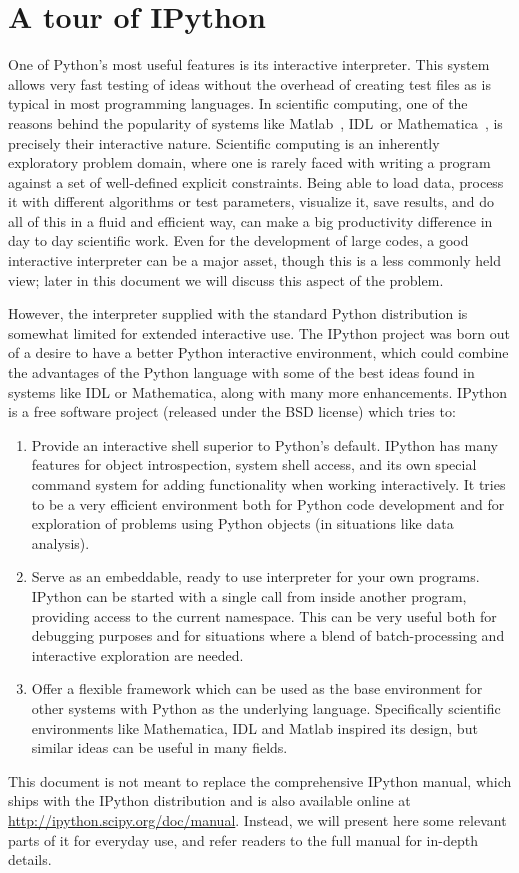 
\chapter{A tour of IPython}

One of Python's most useful features is its interactive interpreter.
This system allows very fast testing of ideas without the overhead
of creating test files as is typical in most programming languages.
In scientific computing, one of the reasons behind the popularity
of systems like Matlab~\texttrademark, IDL~\texttrademark or Mathematica~\texttrademark,
is precisely their interactive nature. Scientific computing is an
inherently exploratory problem domain, where one is rarely faced with
writing a program against a set of well-defined explicit constraints.
Being able to load data, process it with different algorithms or test
parameters, visualize it, save results, and do all of this in a fluid
and efficient way, can make a big productivity difference in day to
day scientific work. Even for the development of large codes, a good
interactive interpreter can be a major asset, though this is a less
commonly held view; later in this document we will discuss this aspect
of the problem.

However, the interpreter supplied with the standard Python distribution
is somewhat limited for extended interactive use. The IPython project
\cite{IPython} was born out of a desire to have a better Python interactive
environment, which could combine the advantages of the Python language
with some of the best ideas found in systems like IDL or Mathematica,
along with many more enhancements. IPython is a free software project
(released under the BSD license) which tries to:

\begin{enumerate}
\item Provide an interactive shell superior to Python's default. IPython
has many features for object introspection, system shell access, and
its own special command system for adding functionality when working
interactively. It tries to be a very efficient environment both for
Python code development and for exploration of problems using Python
objects (in situations like data analysis).
\item Serve as an embeddable, ready to use interpreter for your own programs.
IPython can be started with a single call from inside another program,
providing access to the current namespace. This can be very useful
both for debugging purposes and for situations where a blend of batch-processing
and interactive exploration are needed.
\item Offer a flexible framework which can be used as the base environment
for other systems with Python as the underlying language. Specifically
scientific environments like Mathematica, IDL and Matlab inspired
its design, but similar ideas can be useful in many fields.
\end{enumerate}
This document is not meant to replace the comprehensive IPython manual,
which ships with the IPython distribution and is also available online
at \url{http://ipython.scipy.org/doc/manual}. Instead, we will present
here some relevant parts of it for everyday use, and refer readers
to the full manual for in-depth details. 


